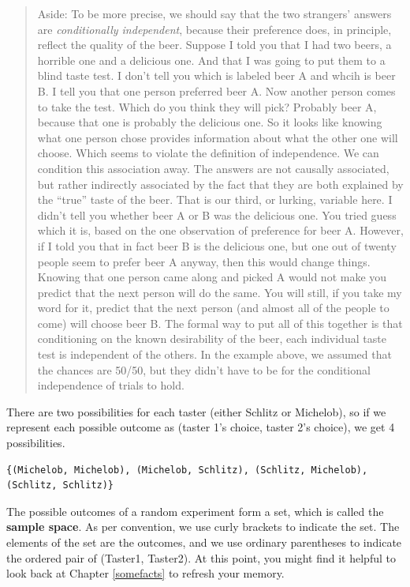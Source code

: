 \documentclass[openany]{book}
\begin{document}
\begin{quote}
Aside: To be more precise, we should say that the two strangers' answers are \emph{conditionally independent}, because their preference does, in principle, reflect the quality of the beer. Suppose I told you that I had two beers, a horrible one and a delicious one. And that I was going to put them to a blind taste test. I don't tell you which is labeled beer A and whcih is beer B. I tell you that one person preferred beer A. Now another person comes to take the test. Which do you think they will pick? Probably beer A, because that one is probably the delicious one. So it looks like knowing what one person chose provides information about what the other one will choose. Which seems to violate the definition of independence. We can condition this association away. The answers are not causally associated, but rather indirectly associated by the fact that they are both explained by the ``true'' taste of the beer. That is our third, or lurking, variable here. I didn't tell you whether beer A or B was the delicious one. You tried guess which it is, based on the one observation of preference for beer A. However, if I told you that in fact beer B is the delicious one, but one out of twenty people seem to prefer beer A anyway, then this would change things. Knowing that one person came along and picked A would not make you predict that the next person will do the same. You will still, if you take my word for it, predict that the next person (and almost all of the people to come) will choose beer B. The formal way to put all of this together is that conditioning on the known desirability of the beer, each individual taste test is independent of the others. In the example above, we assumed that the chances are 50/50, but they didn't have to be for the conditional independence of trials to hold.
\end{quote}

There are two possibilities for each taster (either Schlitz or Michelob), so if we represent each possible outcome as (taster 1's choice, taster 2's choice), we get 4 possibilities.

\begin{verbatim}
{(Michelob, Michelob), (Michelob, Schlitz), (Schlitz, Michelob), (Schlitz, Schlitz)}
\end{verbatim}

The possible outcomes of a random experiment form a set, which is called the \textbf{sample space}. As per convention, we use curly brackets to indicate the set. The elements of the set are the outcomes, and we use ordinary parentheses to indicate the ordered pair of (Taster1, Taster2). At this point, you might find it helpful to look back at Chapter \ref{somefacts} to refresh your memory.
\end{document}
